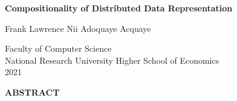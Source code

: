 \begin{center}

\vfill

{\large\bf Compositionality of Distributed Data Representation}

\vspace{5mm}

Frank Lawrence Nii Adoquaye Acquaye

{\singlespacing
Faculty of Computer Science\\
National Research University Higher School of Economics\\
2021\\
}

\vspace{5mm}

{\large\bf ABSTRACT}
\end{center}

